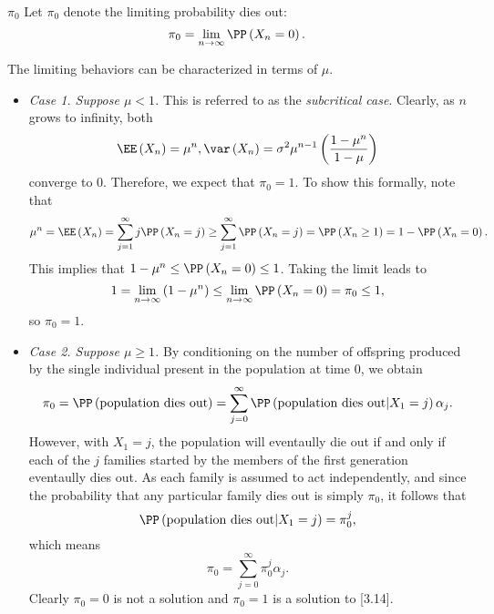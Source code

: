 \documentclass[stat333]{subfiles}
\begin{document}
    \begin{notation}{$\pi_0$}{}
        Let $\pi_0$ denote the limiting probability dies out:
        \begin{equation*}
            \pi_0 = \lim_{n\to\infty} \PP\left( X_n=0 \right).
        \end{equation*}
    \end{notation}

    \noindent The limiting behaviors can be characterized in terms of $\mu$.
    \begin{itemize}
        \item \textit{Case 1. Suppose $\mu<1$.} This is referred to as the \textit{subcritical case}. Clearly, as $n$ grows to infinity, both
            \begin{equation*}
                \EE\left( X_n \right) = \mu^n, \var\left( X_n \right) = \sigma^{2}\mu^{n-1}\left( \frac{1-\mu^n}{1-\mu} \right)
            \end{equation*}
            converge to $0$. Therefore, we expect that $\pi_0=1$. To show this formally, note that
            \begin{equation*}
                \mu^n = \EE\left( X_n \right) = \sum^{\infty}_{j=1}j\PP\left( X_n=j \right) \geq \sum^{\infty}_{j=1}\PP\left( X_n=j \right) = \PP\left( X_n\geq 1 \right) = 1-\PP\left( X_n=0 \right).
            \end{equation*}
            This implies that $1-\mu^n\leq\PP\left( X_n=0 \right)\leq 1$. Taking the limit leads to
            \begin{equation*}
                1 = \lim_{n\to\infty} \left( 1-\mu^n \right) \leq \lim_{n\to\infty} \PP\left( X_n=0 \right) = \pi_0 \leq 1,
            \end{equation*}
            so $\pi_0=1$.

        \item \textit{Case 2. Suppose $\mu\geq 1$.} By conditioning on the number of offspring produced by the single individual present in the population at time $0$, we obtain
            \begin{equation*}
                \pi_0 = \PP\left( \text{population dies out} \right) = \sum^{\infty}_{j=0} \PP\left( \text{population dies out}|X_1=j \right)\alpha_j.
            \end{equation*}
            However, with $X_1=j$, the population will eventaully die out if and only if each of the $j$ families started by the members of the first generation eventaully dies out. As each family is assumed to act independently, and since the probability that any particular family dies out is simply $\pi_0$, it follows that
            \begin{equation*}
                \PP\left( \text{population dies out}|X_1=j \right) = \pi_0^j,
            \end{equation*}
            which means
            \begin{equation}
                \pi_0 = \sum^{\infty}_{j=0}\pi_0^j\alpha_j.
            \end{equation}
            Clearly $\pi_0=0$ is not a solution and $\pi_0=1$ is a solution to [3.14]. 


\end{itemize}
\end{document}
